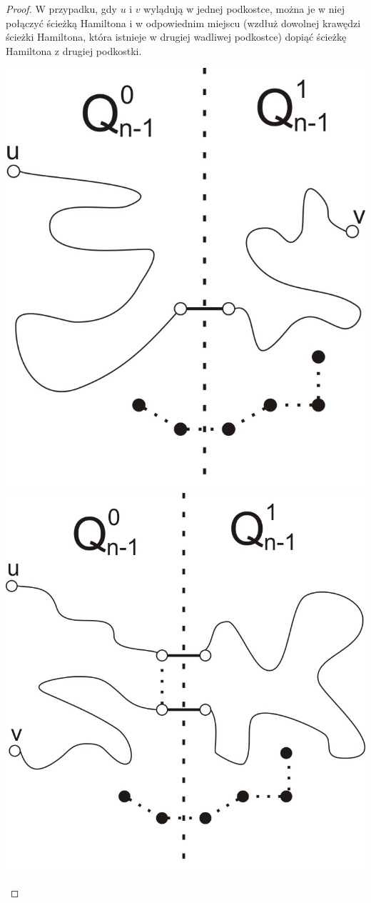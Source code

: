 \documentclass{pracamgr}
\begin{document}
\begin{proof}
     W przypadku, gdy $u$ i $v$ wylądują w jednej podkostce, można je w niej połączyć ścieżką Hamiltona i w odpowiednim miejscu
     (wzdłuż dowolnej krawędzi ścieżki Hamiltona, która istnieje w drugiej wadliwej podkostce) dopiąć ścieżkę Hamiltona z drugiej podkostki.
     \begin{center}
      \includegraphics[scale=0.75]{img/Q_hamilton_p1.jpg}\quad\quad\quad\quad
      \includegraphics[scale=0.75]{img/Q_hamilton_p2.jpg}

\end{center}
\end{proof}
\end{document}
